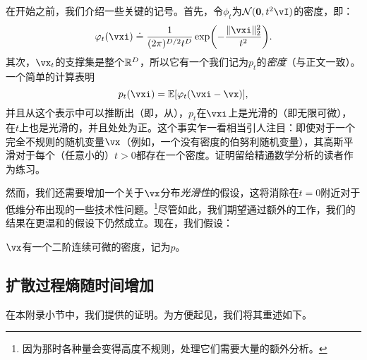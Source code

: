 \documentclass[../../book-main.tex]{subfiles}
\begin{document}
在开始之前，我们介绍一些关键的记号。首先，令\(\phi_{t}\)为\(\dNorm(\vzero, t^{2}\vI)\)的密度，即：
\begin{equation}\label{eq:gaussian_noise_time_t}
    \phi_{t}(\vxi) \doteq \frac{1}{(2\pi)^{D/2}t^{D}}\exp\rp{-\frac{\norm{\vxi}_{2}^{2}}{t^{2}}}.
\end{equation}
其次，\(\vx_{t}\)的支撑集是整个\(\mathbb{R}^{D}\)，所以它有一个我们记为\(p_{t}\)的\textit{密度}（与正文一致）。一个简单的计算表明
\begin{equation}\label{eq:p_t_representation}
    p_{t}(\vxi) = \Ex[\phi_{t}(\vxi - \vx)],
\end{equation}
并且从这个表示中可以推断出（即，从），\(p_{t}\)在\(\vxi\)上是光滑的（即无限可微），在\(t\)上也是光滑的，并且处处为正。这个事实乍一看相当引人注目：即使对于一个完全不规则的随机变量\(\vx\)（例如，一个没有密度的伯努利随机变量），其高斯平滑对于每个（任意小的）\(t > 0\)都存在一个密度。证明留给精通数学分析的读者作为练习。

然而，我们还需要增加一个关于\(\vx\)分布\textit{光滑性}的假设，这将消除在\(t=0\)附近对于低维分布出现的一些技术性问题。\footnote{因为那时各种量会变得高度不规则，处理它们需要大量的额外分析。}尽管如此，我们期望通过额外的工作，我们的结果在更温和的假设下仍然成立。现在，我们假设：
\begin{assumption}\label{assumption:entropy_x_density}
    \(\vx\)有一个二阶连续可微的密度，记为\(p\)。
\end{assumption}


\subsection{扩散过程熵随时间增加}\label{sub:diffusion_entropy_increases}

在本附录小节中，我们提供的证明。为方便起见，我们将其重述如下。
\end{document}

